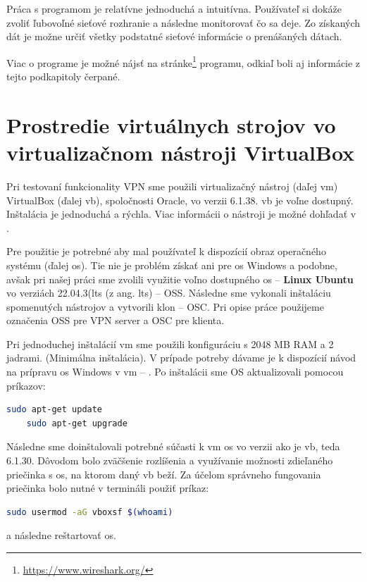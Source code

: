 Práca s programom je relatívne jednoduchá a intuitívna. Používateľ si dokáže zvoliť ľubovoľné sieťové rozhranie a následne monitorovať čo sa deje. Zo získaných dát je možne určiť všetky podstatné sieťové informácie o prenášaných dátach.

Viac o programe je možné nájsť na stránke\footnote{\url{https://www.wireshark.org/}} programu, odkiaľ boli aj informácie z tejto podkapitoly čerpané. 

\section{Prostredie virtuálnych strojov vo virtualizačnom nástroji VirtualBox}\label{merania}
Pri testovaní funkcionality VPN sme použili virtualizačný nástroj (daľej \acrshort{vm}) VirtualBox (ďalej \acrshort{vb}), spoločnosti Oracle, vo verzii 6.1.38. \acrshort{vb} je voľne dostupný. Inštalácia je jednoduchá a rýchla. Viac informácii o nástroji je možné dohľadať v \cite{vbox}.

Pre použitie je potrebné aby mal používateľ k dispozícií obraz operačného systému (ďalej \acrshort{os}). Tie nie je problém získať ani pre \acrshort{os} Windows a podobne, avšak pri našej práci sme zvolili využitie voľno dostupného  \acrshort{os} -- \textbf{Linux Ubuntu} vo verziách 22.04.3(\acrshort{lts} (z ang. \acrlong{lts}) -- OSS. Následne sme vykonali inštaláciu spomenutých nástrojov a vytvorili klon -- OSC. Pri opise práce použijeme označenia OSS pre VPN server a OSC pre klienta.

Pri jednoduchej inštalácií \acrshort{vm} sme použili konfiguráciu s  2048 MB RAM a 2 jadrami. (Minimálna inštalácia). V prípade potreby dávame je k dispozícií návod na prípravu \acrshort{os} Windows v \acrshort{vm} -- \cite{vmkonfig}. Po inštalácii sme OS aktualizovali pomocou príkazov:
\begin{lstlisting}[language=bash]
	sudo apt-get update
	sudo apt-get upgrade
\end{lstlisting}
Následne sme doinštalovali potrebné súčasti k \acrshort{vm} \acrshort{os} vo verzii ako je \acrshort{vb}, teda 6.1.30. Dôvodom bolo zväčšenie rozlíšenia a využívanie možnosti zdieľaného priečinka s \acrshort{os}, na ktorom daný \acrshort{vb} beží. Za účelom správneho fungovania priečinka bolo nutné v termináli použiť príkaz:
\begin{lstlisting}[language=bash]
	sudo usermod -aG vboxsf $(whoami)
\end{lstlisting}
a následne reštartovať \acrshort{os}.

